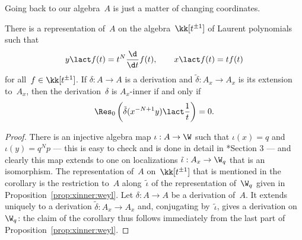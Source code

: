 Going back to our algebra~$A$ is just a matter of changing coordinates.

\begin{Corollary}
There is a representation of~$A$ on the algebra~$\kk[t^{\pm1}]$ of Laurent
polynomials such that
  \[
  y \lact f(t) = t^N\frac{\d}{\d t}f(t),
  \qquad
  x \lact f(t) = tf(t)
  \]
for all~$f\in\kk[t^{\pm1}]$. If $\delta:A\to A$ is a derivation and
$\tilde\delta:A_x\to A_x$ is its extension to~$A_x$, then the
derivation~$\delta$ is $A_x$-inner if and only if
  \[
  \Res_0\left(\tilde\delta(x^{-N+1}y)\lact \frac{1}{t} \right) = 0.
  \]
\end{Corollary}

\begin{proof}
There is an injective algebra map $\iota:A\to\W$ such that $\iota(x)=q$ and
$\iota(y)=q^Np$ --- this is easy to check and is done in detail in
\cite{BLO:1}*{Section 3} --- and clearly this map extends to one on
localizations $\tilde\iota:A_x\to\W_q$ that is an isomorphism. The
representation of~$A$ on~$\kk[t^{\pm1}]$ that is mentioned in the corollary
is the restriction to~$A$ along~$\tilde\iota$ of the representation
of~$\W_q$ given in Proposition~\ref{prop:xinner:weyl}. Let $\delta:A\to A$
be a derivation of~$A$. It extends uniquely to a derivation
$\tilde\delta:A_x\to A_x$ and, conjugating by~$\tilde\iota$, gives a
derivation on~$\W_q$: the claim of the corollary thus follows immediately 
from the last part of Proposition~\ref{prop:xinner:weyl}.
\end{proof}
